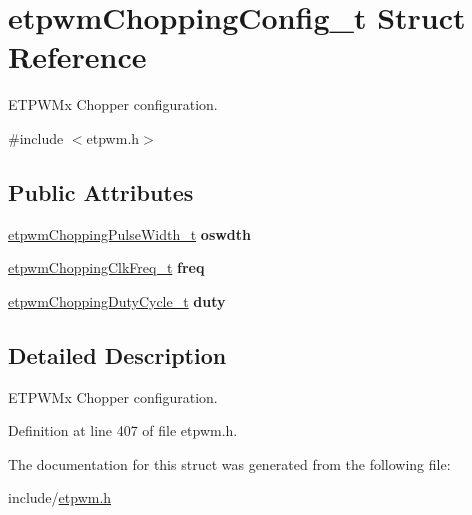 \hypertarget{structetpwmChoppingConfig__t}{}\section{etpwm\+Chopping\+Config\+\_\+t Struct Reference}
\label{structetpwmChoppingConfig__t}


E\+T\+P\+W\+Mx Chopper configuration.  




{\ttfamily \#include $<$etpwm.\+h$>$}

\subsection*{Public Attributes}
\begin{DoxyCompactItemize}
\item 
\mbox{\label{structetpwmChoppingConfig__t_ab1839a075eb2e496c14f8e2ed8bbd97f}} 
\mbox{\hyperlink{etpwm_8h_a0438be91701ec609294a76b9d3c8d614}{etpwm\+Chopping\+Pulse\+Width\+\_\+t}} {\bfseries oswdth}
\item 
\mbox{\label{structetpwmChoppingConfig__t_acd742d228249ff2e67e0b015aa042f46}} 
\mbox{\hyperlink{etpwm_8h_ab2e66b21c70a9ca5db3d872017e113a6}{etpwm\+Chopping\+Clk\+Freq\+\_\+t}} {\bfseries freq}
\item 
\mbox{\label{structetpwmChoppingConfig__t_a60b10fe267b1dabce85e4484d93a726d}} 
\mbox{\hyperlink{etpwm_8h_aa7f9bda767c0fc115ebf5df8df14e210}{etpwm\+Chopping\+Duty\+Cycle\+\_\+t}} {\bfseries duty}
\end{DoxyCompactItemize}


\subsection{Detailed Description}
E\+T\+P\+W\+Mx Chopper configuration. 

Definition at line 407 of file etpwm.\+h.



The documentation for this struct was generated from the following file\+:\begin{DoxyCompactItemize}
\item 
include/\mbox{\hyperlink{etpwm_8h}{etpwm.\+h}}\end{DoxyCompactItemize}

